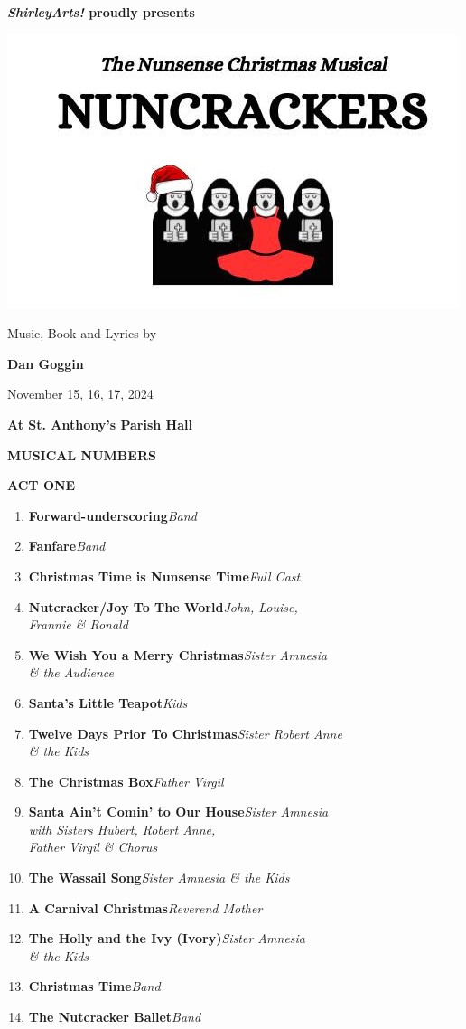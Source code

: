 \documentclass[12pt, a5paper, oneside]{article}
\begin{document}
\newcommand\song[2]{\item\raggedright\textbf{#1}\dotfill \raggedleft\emph{#2}\par}
\newcommand\cast[2]{\textbf{#2}\dotfill \emph{#1}\newline}
\pagestyle{empty} %
\setlength\parindent{0em} %

\begin{center}

\huge \textbf{\emph{ShirleyArts!} proudly presents}

\includegraphics[scale=2.0]{media/nuncrackers_logo.jpg}

Music, Book and Lyrics by

\textbf{Dan Goggin}

\Large 
\hfill \break

November 15, 16, 17, 2024

\textbf{At St. Anthony's Parish Hall}
\end{center}
\pagebreak

\begin{center}
\Large \textbf{MUSICAL NUMBERS}
\end{center}

\large \textbf{ACT ONE}
\normalsize

\begin{enumerate}
\song{Forward-underscoring}{Band}
\song{Fanfare}{Band}
\song{Christmas Time is Nunsense Time}{Full Cast}
\song{Nutcracker/Joy To The World}{John, Louise, \\Frannie \& Ronald}
\song{We Wish You a Merry Christmas}{Sister Amnesia \\\& the Audience}
\song{Santa's Little Teapot}{Kids}
\song{Twelve Days Prior To Christmas}{Sister Robert Anne \\\& the Kids}
\song{The Christmas Box}{Father Virgil}
\song{Santa Ain't Comin' to Our House}{Sister Amnesia \\with Sisters Hubert, Robert Anne,\\ Father Virgil \& Chorus}
\song{The Wassail Song}{Sister Amnesia \& the Kids}
\song{A Carnival Christmas}{Reverend Mother}
\song{The Holly and the Ivy (Ivory)}{Sister Amnesia \\ \& the Kids}
\song{Christmas Time}{Band}
\song{The Nutcracker Ballet}{Band}
\end{enumerate}
\end{document}
